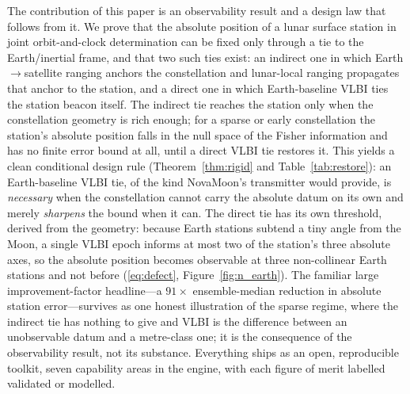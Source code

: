 The contribution of this paper is an observability result and a design law that
follows from it. We prove that the absolute position of a lunar surface station
in joint orbit-and-clock determination can be fixed only through a tie to the
Earth/inertial frame, and that two such ties exist: an indirect one in which
Earth$\to$satellite ranging anchors the constellation and lunar-local ranging
propagates that anchor to the station, and a direct one in which Earth-baseline
VLBI ties the station beacon itself. The indirect tie reaches the station only
when the constellation geometry is rich enough; for a sparse or early
constellation the station's absolute position falls in the null space of the
Fisher information and has no finite error bound at all, until a direct VLBI tie
restores it. This yields a clean conditional design rule (Theorem~\ref{thm:rigid}
and Table~\ref{tab:restore}): an Earth-baseline VLBI tie, of the kind NovaMoon's
transmitter would provide, is \emph{necessary} when the constellation cannot
carry the absolute datum on its own and merely \emph{sharpens} the bound when it
can. The direct tie has its own threshold, derived from the geometry: because
Earth stations subtend a tiny angle from the Moon, a single VLBI epoch informs at
most two of the station's three absolute axes, so the absolute position becomes
observable at three non-collinear Earth stations and not before
(\eqref{eq:defect}, Figure~\ref{fig:n_earth}). The familiar large
improvement-factor headline---a $91\times$ ensemble-median reduction in absolute
station error---survives as one honest illustration of the sparse regime, where
the indirect tie has nothing to give and VLBI is the difference between an
unobservable datum and a metre-class one; it is the consequence of the
observability result, not its substance. Everything ships as an open,
reproducible toolkit, seven capability areas in the  engine, with
each figure of merit labelled validated or modelled.

